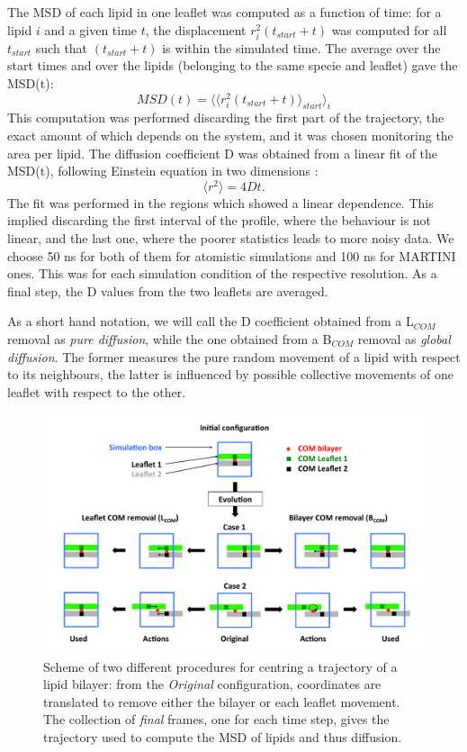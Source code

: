 \begin{itemize}
The MSD of each lipid in one leaflet was computed as a function of time: for a lipid $i$ and a given time $t$, the displacement $r_i^2(t_{start}+t)$ was computed for all $t_{start}$ such that $(t_{start}+t)$ is within the simulated time. The average over the start times and over the lipids (belonging to the same specie and leaflet) gave the MSD(t):
\begin{equation}
MSD(t) = \langle \langle r_i^2(t_{start}+t) \rangle_{start} \rangle_i
\end{equation}
This computation was performed discarding the first part of the trajectory, the exact amount of which depends on the system, and it was chosen monitoring the area per lipid.
The diffusion coefficient D was obtained from a linear fit of the MSD(t), following Einstein equation in two dimensions \citep{Einstein1956}:
\begin{equation}
\langle r^2 \rangle = 4Dt.
\end{equation}
The fit was performed in the regions which showed a linear dependence. This implied discarding the first interval of the profile, where the behaviour is not linear, and the last one, where the poorer statistics leads to more noisy data. We choose 50 ns for both of them for atomistic simulations and 100 ns for MARTINI ones. This was for each simulation condition of the respective resolution. As a final step, the D values from the two leaflets are averaged.

As a short hand notation, we will call the D coefficient obtained from a L$_{COM}$ removal as \emph{pure diffusion}, while the one obtained from a B$_{COM}$ removal as \emph{global diffusion}.
%
The former measures the pure random movement of a lipid with respect to its neighbours, the latter is influenced by possible collective movements of one leaflet with respect to the other.
\begin{figure}[t!]
\centering
\includegraphics[width=0.95\linewidth]{3results_capsule/pics/diff_comrem} 
\caption[Scheme of trajectories preprocessing for computation of diffusion]{Scheme of two different procedures for centring a trajectory of a lipid bilayer: from the \emph{Original} configuration, coordinates are translated to remove either the bilayer or each leaflet movement. The collection of \emph{final} frames, one for each time step, gives the trajectory used to compute the MSD of lipids and thus diffusion.}
\label{fig:com_rem_scheme}
\end{figure}
\end{itemize}

